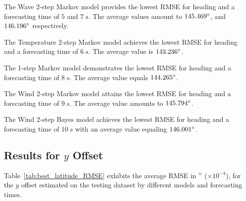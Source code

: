 \documentclass[preprint,12pt]{elsarticle}
\begin{document}
The Wave 2-step Markov model provides the lowest RMSE for heading and a forecasting time of $5$ and $7 \ s$. The average values amount to $145.469 \degree$, and $146.196 \degree$ respectively.

The Temperature 2-step Markov model achieves the lowest RMSE for heading and a forecasting time of $6 \ s$. The average value is $143.236 \degree$.

The 1-step Markov model demonstrates the lowest RMSE for heading and a forecasting time of $8 \ s$. The average value equals $144.265 \degree$.

The Wind 2-step Markov model attains the lowest RMSE for heading and a forecasting time of $9 \ s$. The average value amounts to $145.794 \degree$.

The Wind 2-step Bayes model achieves the lowest RMSE for heading and a forecasting time of $10 \ s$ with an average value equaling $146.001 \degree$.

\subsection{Results for $y$ Offset}

Table~\ref{tab:best_latitude_RMSE} exhibits the average RMSE in $\degree$ ($\times 10^{-4}$), for the $y$ offset estimated on the testing dataset by different models and forecasting times.
\end{document}
